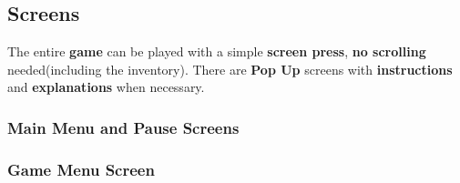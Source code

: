 		\subsection{Screens}
			\par The entire \textbf{game} can be played with a simple \textbf{screen press}, \textbf{no scrolling} needed(including the inventory). There are \textbf{Pop Up} screens with \textbf{instructions} and \textbf{explanations} when necessary.
			\subsubsection{Main Menu and Pause Screens}
				\begin{figure}[H]
					\centering
				\end{figure}

			\subsubsection{Game Menu Screen}
				\begin{figure}[H]
					\centering
				\end{figure}

